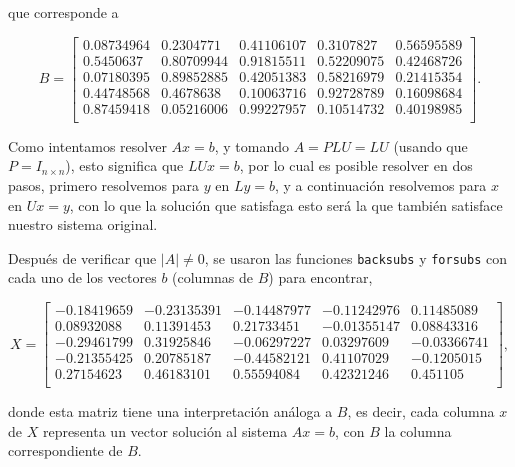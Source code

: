 \documentclass{article}
\begin{document}
\begin{enumerate}
    
        que corresponde a 


        \begin{equation*}
            B = \begin{bmatrix}
                0.08734964 & 0.2304771 & 0.41106107 & 0.3107827 & 0.56595589\\
                0.5450637 & 0.80709944 & 0.91815511 & 0.52209075 & 0.42468726\\
                0.07180395 & 0.89852885 & 0.42051383 & 0.58216979 & 0.21415354\\
                0.44748568 & 0.4678638 & 0.10063716 & 0.92728789 & 0.16098684\\
                0.87459418 & 0.05216006 & 0.99227957 & 0.10514732 & 0.40198985\\
              \end{bmatrix}.
        \end{equation*}
        
        Como intentamos resolver $Ax = b$, y tomando $A = PLU = LU$ (usando que $P = I_{n\times n}$),
        esto significa que $LUx = b$, por lo cual es posible resolver en dos pasos, primero
        resolvemos para $y$ en $Ly = b$, y a continuación resolvemos para $x$ en $Ux = y$, con lo que
        la solución que satisfaga esto será la que también satisface nuestro sistema original.

        Después de verificar que $|A| \neq 0$, se usaron las funciones \texttt{backsubs} y \texttt{forsubs}
        con cada uno de los vectores $b$ (columnas de $B$) para encontrar,

        \begin{equation*}
            X = \begin{bmatrix}
                -0.18419659 & -0.23135391 & -0.14487977 & -0.11242976 & 0.11485089\\
                0.08932088 & 0.11391453 & 0.21733451 & -0.01355147 & 0.08843316\\
                -0.29461799 & 0.31925846 & -0.06297227 & 0.03297609 & -0.03366741\\
                -0.21355425 & 0.20785187 & -0.44582121 & 0.41107029 & -0.1205015\\
                0.27154623 & 0.46183101 & 0.55594084 & 0.42321246 & 0.451105\\
              \end{bmatrix},
        \end{equation*}

        donde esta matriz tiene una interpretación análoga a $B$, es decir, cada columna $x$ de $X$
        representa un vector solución al sistema $Ax = b$, con $B$ la columna correspondiente de
        $B$.


\end{enumerate}
\end{document}
